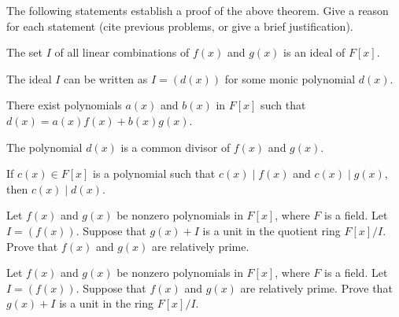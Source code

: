 \begin{problem}\label{prob:gcdlincomb}
The following statements establish a proof of the above theorem. Give a reason for each statement (cite previous problems, or give a brief justification).
\begin{annotation}
\end{annotation}
\begin{problemparts}
  \item The set \(I\) of all linear combinations of \(f(x)\) and \(g(x)\) is an ideal of \(F[x]\).
  \item The ideal \(I\) can be written as \(I = (d(x))\) for some monic polynomial \(d(x)\).
  \item There exist polynomials \(a(x)\) and \(b(x)\) in \(F[x]\) such that \(d(x) = a(x)f(x) + b(x)g(x)\).
  \item The polynomial \(d(x)\) is a common divisor of \(f(x)\) and \(g(x)\).
  \item If \(c(x)\in F[x]\) is a polynomial such that \(c(x) \mid f(x)\) and \(c(x) \mid g(x)\), then \(c(x) \mid d(x)\).
\end{problemparts}
\end{problem}

\begin{problem}\label{prob:unitquotring}
Let \(f(x)\) and \(g(x)\) be nonzero polynomials in \(F[x]\), where \(F\) is a field. Let \(I = (f(x))\). Suppose that \(g(x) + I\) is a unit in the quotient ring \(F[x]/I\). Prove that \(f(x)\) and \(g(x)\) are relatively prime.
\begin{annotation}
\end{annotation}
\end{problem}

\begin{problem}\label{prob:unitquotring2}
Let \(f(x)\) and \(g(x)\) be nonzero polynomials in \(F[x]\), where \(F\) is a field. Let \(I = (f(x))\). Suppose that \(f(x)\) and \(g(x)\) are relatively prime. Prove that \(g(x) + I\) is a unit in the ring \(F[x]/I\).
\end{problem}


